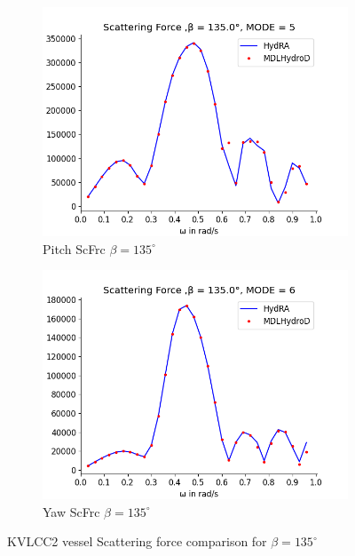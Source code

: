 \begin{figure}[H]
\begin{subfigure}[b]{0.49\textwidth}
        \includegraphics[width=\textwidth]{plots/kvlcc/sc/sc5.png}
        \caption{Pitch ScFrc $\beta = 135^{\circ}$}
    \end{subfigure}
    \begin{subfigure}[b]{0.49\textwidth}
        \includegraphics[width=\textwidth]{plots/kvlcc/sc/sc6.png}
        \caption{Yaw ScFrc $\beta = 135^{\circ}$}
    \end{subfigure}
    \caption{KVLCC2 vessel Scattering force comparison for $\beta= 135^{\circ}$}
    \label{fig:kvlcc_scattering}
\end{figure}
